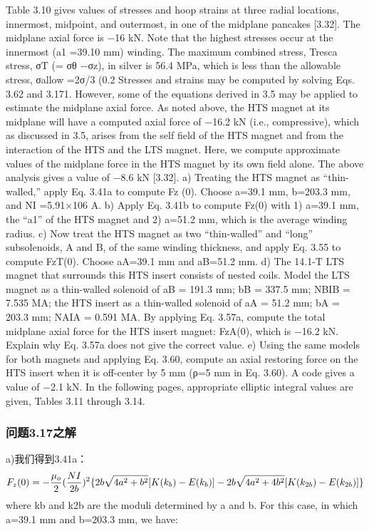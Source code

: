 Table 3.10 gives values of stresses and hoop strains at three radial locations, innermost, midpoint, and outermost, in one of the midplane pancakes [3.32]. The
midplane axial force is −16 kN. Note that the highest stresses occur at the innermost (a1 =39.10 mm) winding. The maximum combined stress, Tresca stress,
σT (= σθ −σz), in silver is 56.4 MPa, which is less than the allowable stress,
σallow =2σ/3 (0.2%
Stresses and strains may be computed by solving Eqs. 3.62 and 3.171. However,
some of the equations derived in 3.5 may be applied to estimate the midplane axial
force. As noted above, the HTS magnet at its midplane will have a computed axial
force of −16.2 kN (i.e., compressive), which as discussed in 3.5, arises from the
self field of the HTS magnet and from the interaction of the HTS and the LTS
magnet. Here, we compute approximate values of the midplane force in the HTS
magnet by its own field alone. The above analysis gives a value of −8.6 kN [3.32].
a) Treating the HTS magnet as “thin-walled,” apply Eq. 3.41a to compute
Fz
(0). Choose a=39.1 mm, b=203.3 mm, and NI =5.91×106 A.
b) Apply Eq. 3.41b to compute Fz(0) with 1) a=39.1 mm, the “a1” of the HTS
magnet and 2) a=51.2 mm, which is the average winding radius.
c) Now treat the HTS magnet as two “thin-walled” and “long” subsolenoids, A
and B, of the same winding thickness, and apply Eq. 3.55 to compute FzT(0).
Choose aA=39.1 mm and aB=51.2 mm.
d) The 14.1-T LTS magnet that surrounds this HTS insert consists of nested
coils. Model the LTS magnet as a thin-walled solenoid of aB = 191.3 mm;
bB
= 337.5 mm; NBIB = 7.535 MA; the HTS insert as a thin-walled solenoid
of aA = 51.2 mm; bA = 203.3 mm; NAIA = 0.591 MA. By applying Eq. 3.57a,
compute the total midplane axial force for the HTS insert magnet: FzA(0),
which is −16.2 kN. Explain why Eq. 3.57a does not give the correct value.
e) Using the same models for both magnets and applying Eq. 3.60, compute
an axial restoring force on the HTS insert when it is off-center by 5 mm
(ρ=5 mm in Eq. 3.60). A code gives a value of −2.1 kN.
In the following pages, appropriate elliptic integral values are given, Tables 3.11
through 3.14.


\subsubsection{问题3.17之解}

a)我们得到3.41a：
$$
F_{z}(0)=-\frac{\mu_{o}}{2}(\frac{NI}{2b})^{2}\{2b\sqrt{4a^{2}+b^{2}}[K(k_{b})-E(k_{b})]\\
-2b\sqrt{4a^{2}+4b^{2}}[K(k_{2b})-E(k_{2b})]\}\\%
$$
where kb and k2b are the moduli determined by a and b. For this case, in which
a=39.1 mm and b=203.3 mm, we have:

